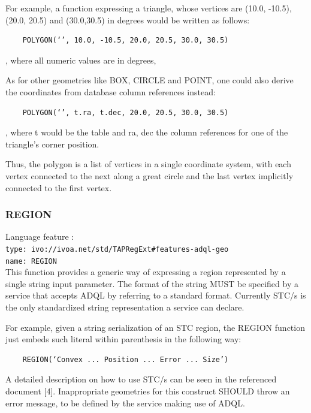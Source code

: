 \documentclass[11pt,a4paper]{ivoa}
\begin{document}
For example, a function expressing a triangle, whose vertices are (10.0,
-10.5), (20.0, 20.5) and (30.0,30.5) in degrees would be written
as follows:

\begin{verbatim}
    POLYGON(‘’, 10.0, -10.5, 20.0, 20.5, 30.0, 30.5)
\end{verbatim}
    
, where all numeric values are in degrees,

As for other geometries like BOX, CIRCLE and POINT, one could also derive
the coordinates from database column references instead:

\begin{verbatim}
    POLYGON(‘’, t.ra, t.dec, 20.0, 20.5, 30.0, 30.5)
\end{verbatim}

, where t would be the table and ra, dec the column references for one of
the triangle’s corner position.

Thus, the polygon is a list of vertices in a single coordinate system, with
each vertex connected to the next along a great circle and the last vertex
implicitly connected to the first vertex.

\subsubsection{REGION}
\label{sec:geom.functions.region}
{\footnotesize Language feature :}\\
{\footnotesize \verb|type: ivo://ivoa.net/std/TAPRegExt#features-adql-geo|}\\
{\footnotesize \verb|name: REGION|}\\

This function provides a generic way of expressing a region represented by
a single string input parameter. The format of the string MUST be specified
by a service that accepts ADQL by referring to a standard format. Currently
STC/s is the only standardized string representation a service can declare.

For example, given a string serialization of an STC region, the REGION
function just embeds such literal within parenthesis in the following way:

\begin{verbatim}
    REGION(‘Convex ... Position ... Error ... Size’)
\end{verbatim}

A detailed description on how to use STC/s can be seen in the referenced
document [4]. Inappropriate geometries for this construct SHOULD throw an
error message, to be defined by the service making use of ADQL.
\end{document}
